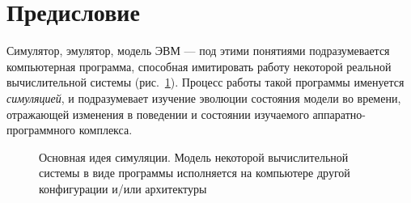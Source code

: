 \chapter*{Предисловие}\label{overview}



Симулятор, эмулятор, модель ЭВМ --- под этими понятиями подразумевается компьютерная программа, способная имитировать работу некоторой реальной вычислительной системы (рис.~\ref{fig:idea}). Процесс работы такой программы именуется \textit{симуляцией}, и подразумевает изучение эволюции состояния модели во времени, отражающей изменения в поведении и состоянии изучаемого аппаратно-программного комплекса.

\setcounter{chapter}{1} %
\setcounter{figure}{-1}
\begin{figure}[tp]
    \centering
    \caption[Основная идея симуляции]{Основная идея симуляции. Модель некоторой вычислительной системы в виде программы исполняется на компьютере другой конфигурации и/или архитектуры}
    \label{fig:idea}
\end{figure}
\setcounter{chapter}{0} %
\setcounter{figure}{0}

